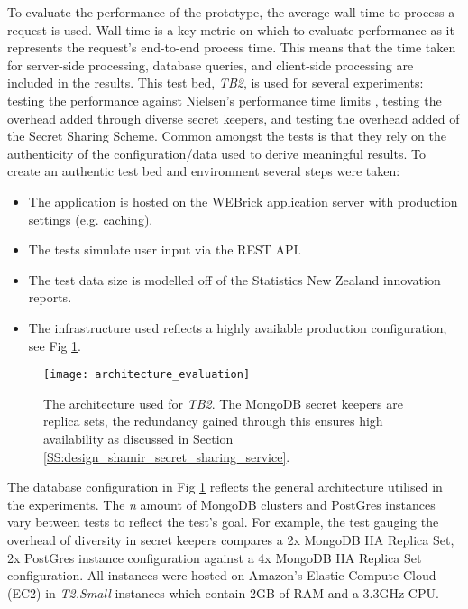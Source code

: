 To evaluate the performance of the prototype, the average wall-time to process a request is used. Wall-time is a key metric on which to evaluate performance as it represents the request's end-to-end process time. This means that the time taken for server-side processing, database queries, and client-side processing are included in the results. This test bed, \textit{TB2}, is used for several experiments: testing the performance against Nielsen's performance time limits \cite{Responsetime:online}, testing the overhead added through diverse secret keepers, and testing the overhead added of the Secret Sharing Scheme. Common amongst the tests is that they rely on the authenticity of the configuration/data used to derive meaningful results. To create an authentic test bed and environment several steps were taken:
\begin{itemize}  
    \item The application is hosted on the WEBrick application server with production settings (e.g. caching).
    \item The tests simulate user input via the REST API.
    \item The test data size is modelled off of the Statistics New Zealand innovation reports.
    \item The infrastructure used reflects a highly available production configuration, see Fig \ref{fig:architecture_evaluation}.
\end{itemize}

\begin{figure}[ht]
    \centering
    \texttt{[image: architecture\_evaluation]}
    \caption{The architecture used for \textit{TB2}. The MongoDB secret keepers are replica sets, the redundancy gained through this ensures high availability as discussed in Section \ref{SS:design_shamir_secret_sharing_service}.}
    \label{fig:architecture_evaluation}
\end{figure}

The database configuration in Fig \ref{fig:architecture_evaluation} reflects the general architecture utilised in the experiments. The \textit{n} amount of MongoDB clusters and PostGres instances vary between tests to reflect the test's goal. For example, the test gauging the overhead of diversity in secret keepers compares a 2x MongoDB HA Replica Set, 2x PostGres instance configuration against a 4x MongoDB HA Replica Set configuration. All instances were hosted on Amazon's Elastic Compute Cloud (EC2) in \textit{T2.Small} instances which contain 2GB of RAM and a 3.3GHz CPU.

